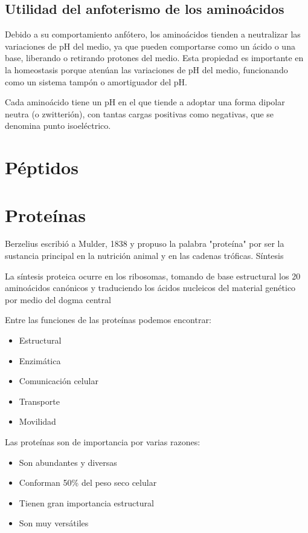 \subsection{Utilidad del anfoterismo de los aminoácidos}

Debido a su comportamiento anfótero, los aminoácidos tienden a neutralizar las variaciones de pH del medio, ya que pueden comportarse como un ácido o una base, liberando o retirando protones del medio. Esta propiedad es importante en la homeostasis porque atenúan las variaciones de pH del medio, funcionando como un sistema tampón o amortiguador del pH.

Cada aminoácido tiene un pH en el que tiende a adoptar una forma dipolar neutra (o zwitterión), con tantas cargas positivas como negativas, que se denomina punto isoeléctrico.

\section{Péptidos}



\section{Proteínas}

Berzelius escribió a Mulder, 1838 y propuso la palabra "proteína" por ser la sustancia principal en la nutrición animal y en las cadenas tróficas.
Síntesis

La síntesis proteica ocurre en los ribosomas, tomando de base estructural los 20 aminoácidos canónicos y traduciendo los ácidos nucleicos del material genético por medio del dogma central

Entre las funciones de las proteínas podemos encontrar:

\begin{itemize}
    \item Estructural
    \item Enzimática
    \item Comunicación celular
    \item Transporte
    \item Movilidad
\end{itemize}

Las proteínas son de importancia por varias razones:

\begin{itemize}
    \item Son abundantes y diversas
    \item Conforman 50\% del peso seco celular
    \item Tienen gran importancia estructural
    \item Son muy versátiles
\end{itemize}